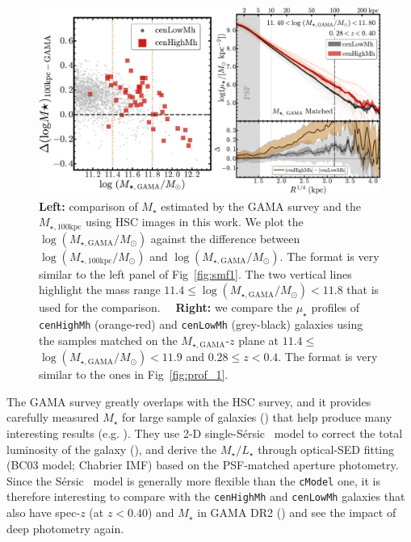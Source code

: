 \documentclass[a4paper,fleqn,usenatbib]{mnras}
\def\ser{{S\'{e}rsic\ }}
\def\rbcg{\texttt{cenHighMh}}
\def\nbcg{\texttt{cenLowMh}}
\def\mstar{{$M_{\star}$}}
\def\mtot{{$M_{\star,100\mathrm{kpc}}$}}
\def\mgama{{$M_{\star,\mathrm{GAMA}}$}}
\def\logmtot{{$\log (M_{\star,100\mathrm{kpc}}/M_{\odot})$}}
\def\logmgama{{$\log (M_{\star,\mathrm{GAMA}}/M_{\odot})$}}
\def\m2l{{$M_{\star}/L_{\star}$}}
\def\mden{{$\mu_{\star}$}}
\begin{document}
\begin{figure}
    \centering
    \includegraphics[width=\textwidth]{fig/redbcg_prof_gama_new}
    \caption{
        \textbf{Left:} comparison of \mstar{} estimated by the GAMA survey and 
        the \mtot{} using HSC images in this work. 
        We plot the \logmgama{} against the difference between \logmtot{} and \logmgama{}. 
        The format is very similar to the left panel of Fig~\ref{fig:smf1}. 
        The two vertical lines highlight the mass range $11.4 \leq$\logmgama{}$<11.8$ 
        that is used for the comparison.~~
        \textbf{Right:} we compare the \mden{} profiles of \rbcg{} (orange-red) and 
        \nbcg{} (grey-black) galaxies using the samples matched on the 
        \mgama{}-$z$ plane at $11.4 \leq$\logmgama{}$<11.9$ and $0.28 \leq z < 0.4$. 
        The format is very similar to the ones in Fig~\ref{fig:prof_1}.}
    \label{fig:gama}
\end{figure}

    The GAMA survey greatly overlaps with the HSC survey, and it provides carefully 
    measured \mstar{} for large sample of galaxies (\citealt{Taylor2011}) that help 
    produce many interesting results (e.g. \citealt{Bauer2013, Ferreras2017}).
    They use 2-D single-\ser{} model to correct the total luminosity of the galaxy 
    (\citealt{Kelvin2012}), and derive the \m2l{} through optical-SED fitting 
    (BC03 model; Chabrier IMF) based on the PSF-matched aperture photometry. 
    Since the \ser{} model is generally more flexible than the \texttt{cModel} one, 
    it is therefore interesting to compare with the \rbcg{} and \nbcg{} galaxies 
    that also have spec-$z$ (at $z < 0.40$) and \mstar{} in GAMA DR2 
    (\citealt{Liske2015}) and see the impact of deep photometry again. 
    
\end{document}
